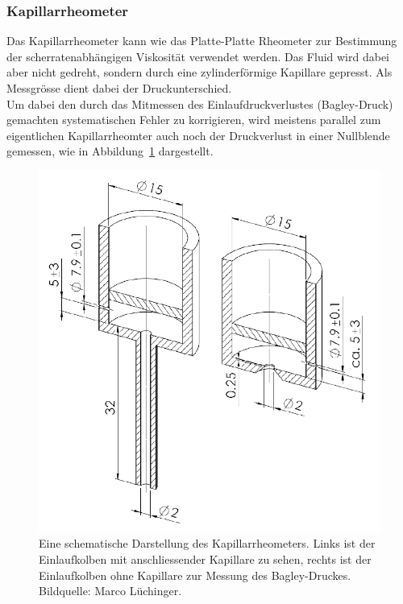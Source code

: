 \subsubsection{Kapillarrheometer}
Das Kapillarrheometer kann wie das Platte-Platte Rheometer zur Bestimmung der scherratenabhängigen Viskosität verwendet werden. Das Fluid wird dabei aber nicht gedreht, sondern durch eine zylinderförmige Kapillare gepresst. Als Messgrösse dient dabei der Druckunterschied.\\
Um dabei den durch das Mitmessen des Einlaufdruckverlustes (Bagley-Druck) gemachten systematischen Fehler zu korrigieren, wird meistens parallel zum eigentlichen Kapillarrheomter auch noch der Druckverlust in einer Nullblende gemessen, wie in Abbildung~\ref{fig:kapRheo} dargestellt.
\begin{figure}
    \centering
    \includegraphics[width=\textwidth]{figures/KapRheo.png}
    \caption{Eine schematische Darstellung des Kapillarrheometers. Links ist der Einlaufkolben mit anschliessender Kapillare zu sehen, rechts ist der Einlaufkolben ohne Kapillare zur Messung des Bagley-Druckes.\\
    Bildquelle: Marco Lüchinger.}
    \label{fig:kapRheo}
\end{figure}

